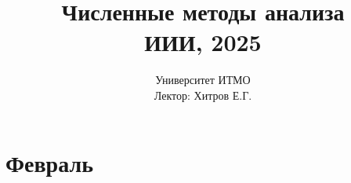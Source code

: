 \documentclass{article}
\author{}
\title{Численные методы анализа\\ИИИ, 2025}
\date{Университет ИТМО \\ Лектор: Хитров Е.Г.}
\begin{document}
\maketitle

\tableofcontents

\newpage

\section{Февраль}

\end{document}
